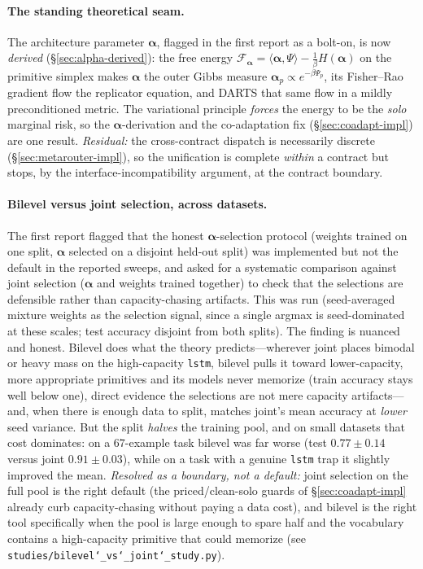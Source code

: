 \documentclass[11pt]{article}
\newcommand{\allowbreakhere}{\discretionary{}{}{}}
\newcommand{\code}[1]{\texttt{\def\_{\char`_\allowbreakhere}#1}}
\newcommand{\alphapar}{\bm{\alpha}}
\newcommand{\F}{\mathcal{F}}
\begin{document}
\paragraph{The standing theoretical seam.} The architecture parameter $\alphapar$, flagged in the first
report as a bolt-on, is now \emph{derived} (\S\ref{sec:alpha-derived}): the free energy
$\F_{\alphapar}=\langle\alphapar,\Psi\rangle-\tfrac1\beta H(\alphapar)$ on the primitive simplex makes
$\alphapar$ the outer Gibbs measure $\alphapar_p\propto e^{-\beta\Psi_p}$, its Fisher--Rao gradient flow the
replicator equation, and DARTS that same flow in a mildly preconditioned metric. The variational principle
\emph{forces} the energy to be the \emph{solo} marginal risk, so the $\alphapar$-derivation and the
co-adaptation fix (\S\ref{sec:coadapt-impl}) are one result. \emph{Residual:} the cross-contract dispatch is
necessarily discrete (\S\ref{sec:metarouter-impl}), so the unification is complete \emph{within} a contract
but stops, by the interface-incompatibility argument, at the contract boundary.

\paragraph{Bilevel versus joint selection, across datasets.} The first report flagged that the honest
$\alphapar$-selection protocol (weights trained on one split, $\alphapar$ selected on a disjoint held-out
split) was implemented but not the default in the reported sweeps, and asked for a systematic comparison
against joint selection ($\alphapar$ and weights trained together) to check that the selections are
defensible rather than capacity-chasing artifacts. This was run (seed-averaged mixture weights as the
selection signal, since a single argmax is seed-dominated at these scales; test accuracy disjoint from both
splits). The finding is nuanced and honest. Bilevel does what the theory predicts---wherever joint places
bimodal or heavy mass on the high-capacity \code{lstm}, bilevel pulls it toward lower-capacity, more
appropriate primitives and its models never memorize (train accuracy stays well below one), direct evidence
the selections are not mere capacity artifacts---and, when there is enough data to split, matches joint's
mean accuracy at \emph{lower} seed variance. But the split \emph{halves} the training pool, and on small
datasets that cost dominates: on a $67$-example task bilevel was far worse (test $0.77\pm0.14$ versus joint
$0.91\pm0.03$), while on a task with a genuine \code{lstm} trap it slightly improved the mean. \emph{Resolved
as a boundary, not a default:} joint selection on the full pool is the right default (the priced/clean-solo
guards of \S\ref{sec:coadapt-impl} already curb capacity-chasing without paying a data cost), and bilevel is
the right tool specifically when the pool is large enough to spare half and the vocabulary contains a
high-capacity primitive that could memorize (see \code{studies/bilevel\_vs\_joint\_study.py}).
\end{document}
